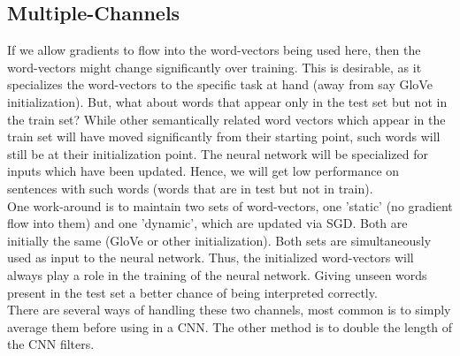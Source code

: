 \documentclass{tufte-handout}
\begin{document}
\subsection{Multiple-Channels}
If we allow gradients to flow into the word-vectors being used here, then the word-vectors might change significantly over training. This is desirable, as it specializes the word-vectors to the specific task at hand (away from say GloVe initialization). But, what about  words that appear only in the test set but not in the train set? While other semantically related word vectors which appear in the train set will have moved significantly from their starting point, such words will still be at their initialization point. The neural network will be specialized for inputs which have been updated. Hence, we will get low performance on sentences with such words (words that are in test but not in train). \\
One work-around is to maintain two sets of word-vectors, one 'static' (no gradient flow into them) and one 'dynamic', which are updated via SGD. Both are initially the same (GloVe or other initialization). Both sets are simultaneously used as input to the neural network. Thus, the initialized word-vectors will always play a role in the training of the neural network. Giving unseen words present in the test set a better chance of being interpreted  correctly. \\
There are several ways of handling these two channels, most common is to simply average them before using in a CNN. The other method is to double the length of the CNN filters.
\end{document}

